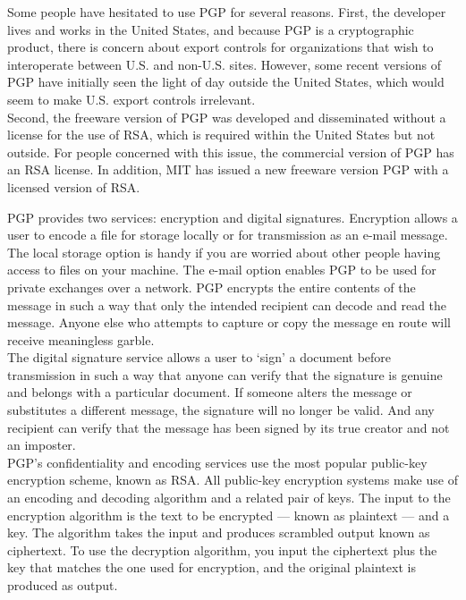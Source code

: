 \begin{htmllist}
  Some people have hesitated to use PGP for several reasons. First, the
  developer lives and works in the United States, and because PGP is a
  cryptographic product, there is concern about export controls for
  organizations that wish to interoperate between U.S. and non-U.S.  sites.
  However, some recent versions of PGP have initially seen the light of day
  outside the United States, which would seem to make U.S.
  export controls irrelevant.\\
  
  Second, the freeware version of PGP was developed and disseminated
  without a license for the use of RSA, which is required within the United
  States but not outside. For people concerned with this issue, the
  commercial version of PGP has an RSA license. In addition, MIT has
  issued a new freeware version PGP with a licensed version of RSA.\\
  
    
    PGP provides two services: encryption and digital signatures.
    Encryption allows a user to encode a file for storage locally or for
    transmission as an e-mail message. The local storage option is handy if
    you are worried about other people having access to files on your
    machine. The e-mail option enables PGP to be used for private exchanges
    over a network. PGP encrypts the entire contents of the message in such
    a way that only the intended recipient can decode and read the message.
    Anyone else who attempts to capture or copy the message en route will
    receive meaningless garble.\\
    
    The digital signature service allows a user to `sign' a document before
    transmission in such a way that anyone can verify that the signature is
    genuine and belongs with a particular document. If someone alters the
    message or substitutes a different message, the signature will no
    longer be valid. And any recipient can verify that the message has been
    signed by its true creator and not an imposter.\\
    
    PGP's confidentiality and encoding services use the most popular
    public-key encryption scheme, known as RSA. All public-key encryption
    systems make use of an encoding and decoding algorithm and a related
    pair of keys. The input to the encryption algorithm is the text to be
    encrypted --- known as plaintext --- and a key. The algorithm takes the
    input and produces scrambled output known as ciphertext. To use the
    decryption algorithm, you input the ciphertext plus the key that
    matches the one used for encryption,
    and the original plaintext is produced as output.\\
    

\end{htmllist}
